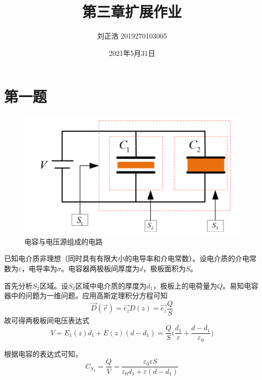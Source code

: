 \documentclass[a4paper]{article}
\title{\heiti\zihao{2} 第三章扩展作业}
\author{\songti 刘正浩 2019270103005}
\date{2021年5月31日}
\begin{document}
	\maketitle
	\thispagestyle{empty}


	\tableofcontents

	\section{第一题}
		\begin{figure}[htbp]
			\centering
			\includegraphics[scale=0.5]{1.png}
			\caption{电容与电压源组成的电路}
		\end{figure}
		已知电介质非理想（同时具有有限大小的电导率和介电常数）。设电介质的介电常数为$\varepsilon$，电导率为$\sigma$。电容器两极板间厚度为$d$，极板面积为$S$。\par
		首先分析$S_2$区域。设$S_2$区域中电介质的厚度为$d_1$，极板上的电荷量为$Q$。易知电容器中的问题为一维问题。应用高斯定理积分方程可知
		\begin{equation}
			\vec{D}(\vec{r}) = \vec{e_z} D(z) = \vec{e_z} \frac{Q}{S}
		\end{equation}
		故可得两极板间电压表达式
		\begin{equation}
			V = E_1(z)d_1 + E(z)(d - d_1) = \frac{Q}{S} \bigg( \frac{d_1}{\varepsilon} + \frac{d - d_1}{\varepsilon_0} \bigg)
		\end{equation}\par
		根据电容的表达式可知，
		\begin{equation}
			C_{S_2} = \frac{Q}{V} = \frac{\varepsilon_0 \varepsilon S}{\varepsilon_0 d_1 + \varepsilon (d-d_1)}
		\end{equation}\par
\end{document}
